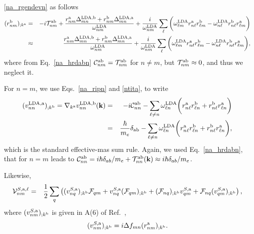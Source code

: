 \documentclass[floatfix,prb,aps,superscriptaddress,11pt,preprint]{revtex4}
\begin{document}
 \eqref{na_rgendevn} as follows
\begin{eqnarray}\label{rgendevapn}
(r^{\mathrm{b}}_{nm})_{;k^{\mathrm{a}}}
&=&
-i{\cal T}^{\mathrm{a}\mathrm{b}}_{nm}
+
\frac{ 
r^{\mathrm{a}}_{nm}
\Delta^{\mathrm{LDA},\mathrm{b}}_{mn}
+r^{\mathrm{b}}_{nm}
\Delta^{\mathrm{LDA},\mathrm{a}}_{mn}
}
{\omega^{\mathrm{LDA}}_{nm}}
+
\frac{i}{\omega^{\mathrm{LDA}}_{nm}}
\sum_{\ell}
\bigg(
\omega^{\mathrm{LDA}}_{\ell m} 
r^{\mathrm{a}}_{n\ell} 
r^{\mathrm{b}}_{\ell m}
-
\omega^{\mathrm{LDA}}_{n\ell} 
r^{\mathrm{b}}_{n\ell} 
r^{\mathrm{a}}_{\ell m}
\bigg)
\nonumber\\
&\approx&
\frac{ 
r^{\mathrm{a}}_{nm}
\Delta^{\mathrm{LDA},\mathrm{b}}_{mn}
+r^{\mathrm{b}}_{nm}
\Delta^{\mathrm{LDA},\mathrm{a}}_{mn}
}
{\omega^{\mathrm{LDA}}_{nm}}
+
\frac{i}{\omega^{\mathrm{LDA}}_{nm}}
\sum_{\ell}
\bigg(
\omega^{\mathrm{LDA}}_{\ell m} 
r^{\mathrm{a}}_{n\ell} 
r^{\mathrm{b}}_{\ell m}
-
\omega^{\mathrm{LDA}}_{n\ell} 
r^{\mathrm{b}}_{n\ell} 
r^{\mathrm{a}}_{\ell m}
\bigg)
,
\end{eqnarray} 
where from Eq.~\eqref{na_hrdabn} 
${\mathbf{\cal C}}^{\mathrm{a}\mathrm{b}}_{nm}={\cal T}^{\mathrm{a}\mathrm{b}}_{nm}$ for $n\ne m$, but 
${\cal T}^{\mathrm{a}\mathrm{b}}_{nm}\approx 0$, and thus we neglect it.\cite{valerie} 

For $n=m$, 
we use Eqs.~\eqref{na_ripn} and \eqref{ntita}, to write
\begin{eqnarray}\label{a.3c}
(v^{\mathrm{LDA},\mathrm{a}}_{nn})_{;k^{\mathrm{b}}}
=
\nabla_{k^{\mathrm{a}}}
v^{\mathrm{LDA},\mathrm{b}}_{nn}(\mathbf{k})
&=&
-i{\mathbf{\cal C}}^{\mathrm{a}\mathrm{b}}_{nn}
-
\sum_{\ell\ne n}
\omega^{\mathrm{LDA}}_{\ell n}
\bigg(
r^{\mathrm{a}}_{n\ell}
r^{\mathrm{b}}_{\ell n}
+
r^{\mathrm{b}}_{n\ell}
r^{\mathrm{a}}_{\ell n}
\bigg)
\nonumber\\
&=&
\frac{\hbar}{m_e}\delta_{\mathrm{a}\mathrm{b}}
-
\sum_{\ell\ne n}
\omega^{\mathrm{LDA}}_{\ell n}
\bigg(
r^{\mathrm{a}}_{n\ell}
r^{\mathrm{b}}_{\ell n}
+
r^{\mathrm{b}}_{n\ell}
r^{\mathrm{a}}_{\ell n}
\bigg)
,
\end{eqnarray}
which is the standard effective-mas sum rule.\cite{nastosPRB05} 
Again, we used Eq.~\eqref{na_hrdabn}, that for $n=m$ leads to 
${\mathbf{\cal C}}^{\mathrm{a}\mathrm{b}}_{nn}=i\hbar\delta_{ab}/m_e
+
{\cal T}_{nn}^{\mathrm{a}\mathrm{b}}(\mathbf{k})
\approx i\hbar\delta_{ab}/m_e
$.\cite{valerie}

Likewise,
\begin{eqnarray}\label{a.3b}
{\mathbf{\cal V}}^{S,\mathrm{a},\ell}_{nm}
&=&
\frac{1}{2}\sum_q\left(
(v^{S,\mathrm{a}}_{nq})_{;k^{\mathrm{b}}}{\mathbf{\cal F}}_{qm}
+
v^{S,\mathrm{a}}_{nq}({\mathbf{\cal F}}_{qm})_{;k^{\mathrm{b}}}
+
({\mathbf{\cal F}}_{nq})_{;k^{\mathrm{b}}} v_{qm}^{S,\mathrm{a}}
+
{\mathbf{\cal F}}_{nq} (v_{qm}^{S,\mathrm{a}})_{;k^{\mathrm{b}}}
\right)
,
\end{eqnarray}
where $(v^{S,\mathrm{a}}_{nm})_{;k^{\mathrm{b}}}$ is given in A(6) of
Ref.~,
\begin{eqnarray}\label{choni.1}
(v^{S,\mathrm{a}}_{nm})_{;k^{\mathrm{b}}}=i\Delta f_{mn}
(r^{\mathrm{a}}_{nm})_{;k^{\mathrm{b}}}
.
\end{eqnarray}
\end{document}
